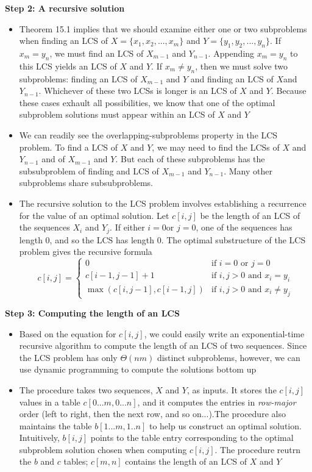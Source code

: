 \documentclass{report}
\begin{document}
\textbf{Step 2: A recursive solution}
\begin{itemize}
    \item Theorem 15.1 implies that we should examine either one or two subproblems when finding an LCS of $X = \{x_1, x_2, ..., x_m\}$ and $Y = \{y_1, y_2, ..., y_n\}$. If $x_m = y_n$, we must find an LCS of $X_{m - 1}$ and $Y_{n - 1}$. Appending $x_m = y_n$ to this LCS yields an LCS of $X$ and $Y$. If $x_m \neq y_n$, then we must solve two subproblems: finding an LCS of $X_{m - 1}$ and $Y$ and finding an LCS of $X$and $Y_{n - 1}$. Whichever of these two LCSs is longer is an LCS of $X$ and $Y$. Because these cases exhault all possibilities, we know that one of the optimal subproblem solutions must appear within an LCS of $X$ and $Y$
    \item We can readily see the overlapping-subproblems property in the LCS problem. To find a LCS of $X$ and $Y$, we may need to find the LCSs of $X$ and $Y_{n - 1}$ and of $X_{m - 1}$ and $Y$. But each of these subproblems has the subsubproblem of finding and LCS of $X_{m - 1}$ and $Y_{n - 1}$. Many other subproblems share subsubproblems.
    \item The recursive solution to the LCS problem involves establishing a recurrence for the value of an optimal solution. Let $c[i, j]$ be the length of an LCS of the sequences $X_i$ and $Y_j$. If either $i = 0$or $j = 0$, one of the sequences has length 0, and so the LCS has length 0. The optimal substructure of the LCS problem gives the recursive formula
    \[
        c[i, j] =
        \begin{cases}
            0 & \text{if $i = 0$ or $j = 0$} \\
            c[i - 1, j - 1] + 1 & \text{if $i, j > 0$ and $x_i = y_i$} \\
            \max(c[i, j - 1], c[i - 1, j]) & \text{if $i, j > 0$ and $x_i \neq y_j$}
        \end{cases}
    \]
\end{itemize}
\textbf{Step 3: Computing the length of an LCS}
\begin{itemize}
    \item Based on the equation for $c[i ,j]$, we could easily write an exponential-time recursive algorithm to compute the length of an LCS of two sequences. Since the LCS problem has only $\Theta(nm)$ distinct subproblems, however, we can use dynamic programming to compute the solutions bottom up
    \item The procedure takes two sequences, $X$ and $Y$, as inputs. It stores the $c[i, j]$ values in a table $c[0...m, 0...n]$, and it computes the entries in \textit{row-major} order (left to right, then the next row, and so on...).The procedure also maintains the table $b[1...m, 1..n]$ to help us construct an optimal solution. Intuitively, $b[i, j]$ points to the table entry corresponding to the optimal subproblem solution chosen when computing $c[i, j]$. The procedure reutrn the $b$ and $c$ tables; $c[m, n]$ contains the length of an LCS of $X$ and $Y$
\end{itemize}
\end{document}
